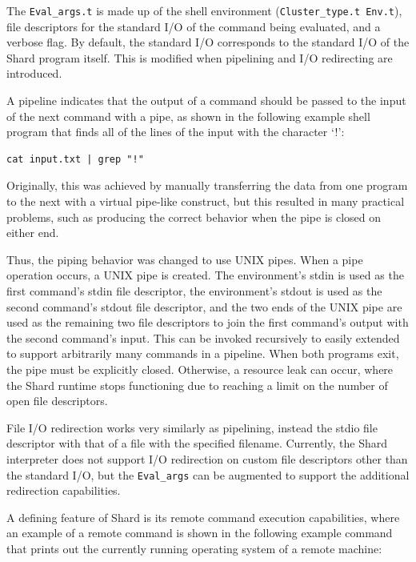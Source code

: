 \documentclass[twoside]{report}
\begin{document}
The \texttt{Eval\_args.t} is made up of the shell environment (\texttt{Cluster\_type.t Env.t}), file descriptors for the standard I/O of the command being evaluated, and a verbose flag.
By default, the standard I/O corresponds to the standard I/O of the Shard program itself.
This is modified when pipelining and I/O redirecting are introduced.

A pipeline indicates that the output of a command should be passed to the input of the next command with a pipe, as shown in the following example shell program that finds all of the lines of the input with the character `!':

\begin{minipage}[c]{\textwidth-15pt}
  \begin{lstlisting}[language=shard]
cat input.txt | grep "!"
\end{lstlisting}
  \smallskip
\end{minipage}

Originally, this was achieved by manually transferring the data from one program to the next with a virtual pipe-like construct, but this resulted in many practical problems, such as producing the correct behavior when the pipe is closed on either end.

Thus, the piping behavior was changed to use UNIX pipes.
When a pipe operation occurs, a UNIX pipe is created.
The environment's stdin is used as the first command's stdin file descriptor, the environment's stdout is used as the second command's stdout file descriptor, and the two ends of the UNIX pipe are used as the remaining two file descriptors to join the first command's output with the second command's input.
This can be invoked recursively to easily extended to support arbitrarily many commands in a pipeline.
When both programs exit, the pipe must be explicitly closed.
Otherwise, a resource leak can occur, where the Shard runtime stops functioning due to reaching a limit on the number of open file descriptors.

File I/O redirection works very similarly as pipelining, instead the stdio file descriptor with that of a file with the specified filename.
Currently, the Shard interpreter does not support I/O redirection on custom file descriptors other than the standard I/O, but the \texttt{Eval\_args} can be augmented to support the additional redirection capabilities.

A defining feature of Shard is its remote command execution capabilities, where an example of a remote command is shown in the following example command that prints out the currently running operating system of a remote machine:
\end{document}
